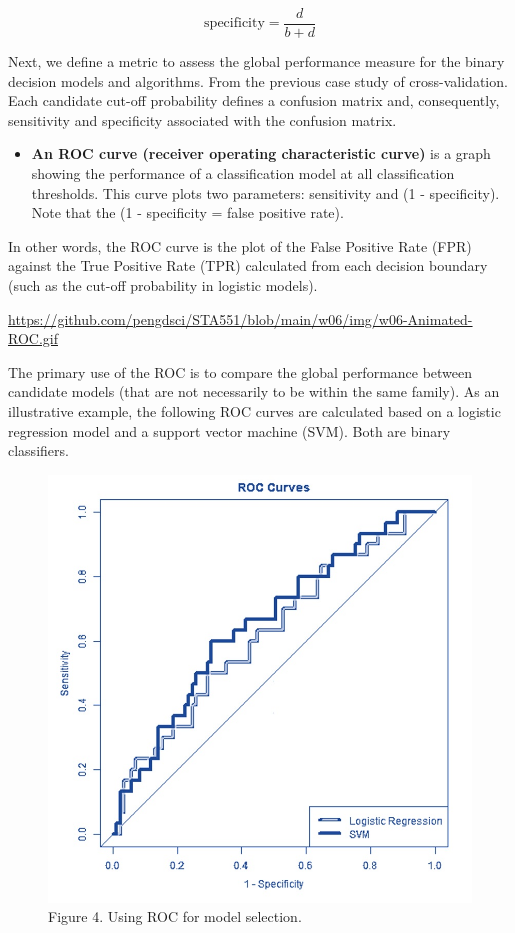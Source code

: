 \documentclass[
]{book}
\providecommand{\tightlist}{%
  \setlength{\itemsep}{0pt}\setlength{\parskip}{0pt}}
\begin{document}
\[
\mbox{specificity} = \frac{d}{b + d}
\]

Next, we define a metric to assess the global performance measure for the binary decision models and algorithms. From the previous case study of cross-validation. Each candidate cut-off probability defines a confusion matrix and, consequently, sensitivity and specificity associated with the confusion matrix.

\begin{itemize}
\tightlist
\item
  \textbf{An ROC curve (receiver operating characteristic curve)} is a graph showing the performance of a classification model at all classification thresholds. This curve plots two parameters: sensitivity and (1 - specificity). Note that the (1 - specificity = false positive rate).
\end{itemize}

In other words, the ROC curve is the plot of the False Positive Rate (FPR) against the True Positive Rate (TPR) calculated from each decision boundary (such as the cut-off probability in logistic models).

\url{https://github.com/pengdsci/STA551/blob/main/w06/img/w06-Animated-ROC.gif}

The primary use of the ROC is to compare the global performance between candidate models (that are not necessarily to be within the same family). As an illustrative example, the following ROC curves are calculated based on a logistic regression model and a support vector machine (SVM). Both are binary classifiers.

\begin{figure}

{\centering \includegraphics[width=11.4in]{img06/w06-ROC-Model-Comparison} 

}

\caption{Figure 4. Using ROC for model selection.}\label{fig:unnamed-chunk-130}
\end{figure}
\end{document}

